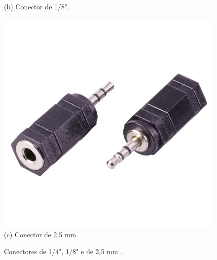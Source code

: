 \begin{figure}[htpb]
\begin{minipage}[t]{0.3\textwidth}
        (b) Conector de 1/8".
    \end{minipage}
    \hfill
    \begin{minipage}[t]{0.3\textwidth}
        \centering
        \includegraphics[width=\textwidth]{figuras/fig21.png}
        \vspace{0.3cm} %
        (c) Conector de 2,5 mm.
    \end{minipage}

    \caption{Conectores de 1/4", 1/8" e de 2,5 mm \cite{mouser}.}
    \label{fig19}
\end{figure}












